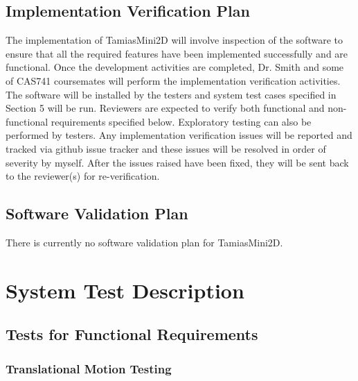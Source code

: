 \documentclass[12pt, titlepage]{article}
\begin{document}
\subsection{Implementation Verification Plan}
 The implementation of TamiasMini2D will involve inspection of the software to ensure that all the required features have been implemented successfully and are functional. Once the development activities are completed, Dr. Smith and some of CAS741 coursemates will perform the implementation verification activities. The software will be installed by the testers and system test cases specified in Section 5 will be run. Reviewers are expected to verify both functional and non-functional requirements specified below. Exploratory testing can also be performed by testers.
 Any implementation verification issues will be reported and tracked via github issue tracker and these issues will be resolved in order of severity by myself. After the issues raised have been fixed, they will be sent back to the reviewer(s) for re-verification.

\subsection{Software Validation Plan}

	There is currently no software validation plan for TamiasMini2D.


\section{System Test Description}
	
\subsection{Tests for Functional Requirements}


\subsubsection{Translational Motion Testing}
	
\end{document}
